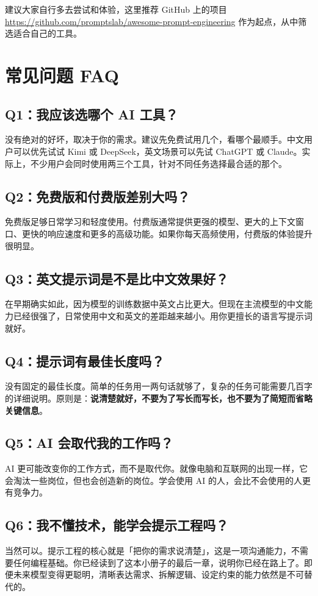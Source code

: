建议大家自行多去尝试和体验，这里推荐 GitHub 上的项目 \url{https://github.com/promptslab/awesome-prompt-engineering} 作为起点，从中筛选适合自己的工具。

\chapter{常见问题 FAQ}
\label{ch:faq}

\section*{Q1：我应该选哪个 AI 工具？}
没有绝对的好坏，取决于你的需求。建议先免费试用几个，看哪个最顺手。中文用户可以优先试试 Kimi 或 DeepSeek，英文场景可以先试 ChatGPT 或 Claude。实际上，不少用户会同时使用两三个工具，针对不同任务选择最合适的那个。

\section*{Q2：免费版和付费版差别大吗？}
免费版足够日常学习和轻度使用。付费版通常提供更强的模型、更大的上下文窗口、更快的响应速度和更多的高级功能。如果你每天高频使用，付费版的体验提升很明显。

\section*{Q3：英文提示词是不是比中文效果好？}
在早期确实如此，因为模型的训练数据中英文占比更大。但现在主流模型的中文能力已经很强了，日常使用中文和英文的差距越来越小。用你更擅长的语言写提示词就好。

\section*{Q4：提示词有最佳长度吗？}
没有固定的最佳长度。简单的任务用一两句话就够了，复杂的任务可能需要几百字的详细说明。原则是：\textbf{说清楚就好，不要为了写长而写长，也不要为了简短而省略关键信息}。

\section*{Q5：AI 会取代我的工作吗？}
AI 更可能改变你的工作方式，而不是取代你。就像电脑和互联网的出现一样，它会淘汰一些岗位，但也会创造新的岗位。学会使用 AI 的人，会比不会使用的人更有竞争力。

\section*{Q6：我不懂技术，能学会提示工程吗？}
当然可以。提示工程的核心就是「把你的需求说清楚」，这是一项沟通能力，不需要任何编程基础。你已经读到了这本小册子的最后一章，说明你已经在路上了。即便未来模型变得更聪明，清晰表达需求、拆解逻辑、设定约束的能力依然是不可替代的。

